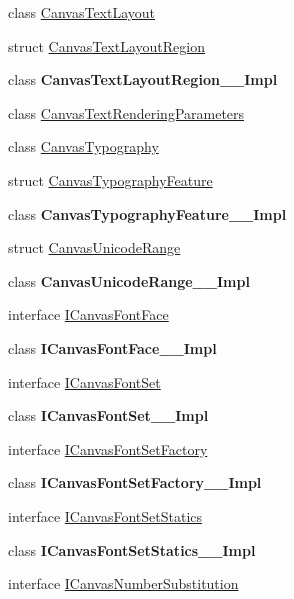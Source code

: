 \begin{DoxyCompactItemize}
class \hyperlink{class_microsoft_1_1_graphics_1_1_canvas_1_1_text_1_1_canvas_text_layout}{Canvas\+Text\+Layout}
\item 
struct \hyperlink{struct_microsoft_1_1_graphics_1_1_canvas_1_1_text_1_1_canvas_text_layout_region}{Canvas\+Text\+Layout\+Region}
\item 
class {\bfseries Canvas\+Text\+Layout\+Region\+\_\+\+\_\+\+Impl}
\item 
class \hyperlink{class_microsoft_1_1_graphics_1_1_canvas_1_1_text_1_1_canvas_text_rendering_parameters}{Canvas\+Text\+Rendering\+Parameters}
\item 
class \hyperlink{class_microsoft_1_1_graphics_1_1_canvas_1_1_text_1_1_canvas_typography}{Canvas\+Typography}
\item 
struct \hyperlink{struct_microsoft_1_1_graphics_1_1_canvas_1_1_text_1_1_canvas_typography_feature}{Canvas\+Typography\+Feature}
\item 
class {\bfseries Canvas\+Typography\+Feature\+\_\+\+\_\+\+Impl}
\item 
struct \hyperlink{struct_microsoft_1_1_graphics_1_1_canvas_1_1_text_1_1_canvas_unicode_range}{Canvas\+Unicode\+Range}
\item 
class {\bfseries Canvas\+Unicode\+Range\+\_\+\+\_\+\+Impl}
\item 
interface \hyperlink{interface_microsoft_1_1_graphics_1_1_canvas_1_1_text_1_1_i_canvas_font_face}{I\+Canvas\+Font\+Face}
\item 
class {\bfseries I\+Canvas\+Font\+Face\+\_\+\+\_\+\+Impl}
\item 
interface \hyperlink{interface_microsoft_1_1_graphics_1_1_canvas_1_1_text_1_1_i_canvas_font_set}{I\+Canvas\+Font\+Set}
\item 
class {\bfseries I\+Canvas\+Font\+Set\+\_\+\+\_\+\+Impl}
\item 
interface \hyperlink{interface_microsoft_1_1_graphics_1_1_canvas_1_1_text_1_1_i_canvas_font_set_factory}{I\+Canvas\+Font\+Set\+Factory}
\item 
class {\bfseries I\+Canvas\+Font\+Set\+Factory\+\_\+\+\_\+\+Impl}
\item 
interface \hyperlink{interface_microsoft_1_1_graphics_1_1_canvas_1_1_text_1_1_i_canvas_font_set_statics}{I\+Canvas\+Font\+Set\+Statics}
\item 
class {\bfseries I\+Canvas\+Font\+Set\+Statics\+\_\+\+\_\+\+Impl}
\item 
interface \hyperlink{interface_microsoft_1_1_graphics_1_1_canvas_1_1_text_1_1_i_canvas_number_substitution}{I\+Canvas\+Number\+Substitution}

\end{DoxyCompactItemize}
